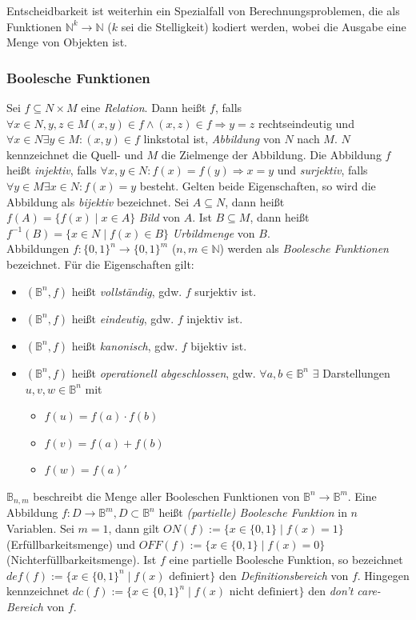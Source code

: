 Entscheidbarkeit ist weiterhin ein Spezialfall von Berechnungsproblemen, die als Funktionen $\mathbb{N}^k \rightarrow \mathbb{N}$ ($k$ sei die Stelligkeit) kodiert werden, wobei die Ausgabe eine Menge von Objekten ist.

\subsubsection{Boolesche Funktionen}
\label{sec:bFunktionen}
Sei $f \subseteq N \times M$ eine \emph{Relation}. Dann heißt $f$, falls $\forall x \in N, y,z \in M (x,y) \in f \wedge (x,z) \in f \Rightarrow y = z$ rechtseindeutig und $\forall x \in N \exists y \in M : (x,y) \in f$ linkstotal ist, \emph{Abbildung} von $N$ nach $M$. $N$ kennzeichnet die Quell- und $M$ die Zielmenge der Abbildung. Die Abbildung $f$ heißt \emph{injektiv}, falls $\forall x,y \in N : f(x) = f(y) \Rightarrow x = y$ und \emph{surjektiv}, falls $\forall y \in M \exists x \in N : f(x) = y$ besteht. Gelten beide Eigenschaften, so wird die Abbildung als \emph{bijektiv} bezeichnet. Sei $A \subseteq N$, dann heißt $f(A) = \{ f(x) \mid x \in A \}$ \emph{Bild} von $A$. Ist $B \subseteq M$, dann heißt $f^{-1}(B) = \{ x \in N \mid f(x) \in B \}$ \emph{Urbildmenge} von $B$.\\
Abbildungen $f: \{0, 1\}^n \rightarrow \{0, 1\}^m$ ($n,m \in \mathbb{N}$) werden als \emph{Boolesche Funktionen} bezeichnet. Für die Eigenschaften gilt:
\begin{itemize}
	\item $(\mathbb{B}^n, f)$ heißt \emph{vollständig}, gdw. $f$ surjektiv ist.
	\item $(\mathbb{B}^n, f)$ heißt \emph{eindeutig}, gdw. $f$ injektiv ist.
	\item $(\mathbb{B}^n, f)$ heißt \emph{kanonisch}, gdw. $f$ bijektiv ist.
	\item $(\mathbb{B}^n, f)$ heißt \emph{operationell abgeschlossen}, gdw. $\forall a,b \in \mathbb{B}^n$ $\exists$ Darstellungen $u,v,w \in \mathbb{B}^n$ mit
	\begin{itemize}
		\item $f(u) = f(a) \cdot f(b)$
		\item $f(v) = f(a) + f(b)$
		\item $f(w) = f(a)'$
	\end{itemize}
\end{itemize}
$\mathbb{B}_{n,m}$ beschreibt die Menge aller Booleschen Funktionen von $\mathbb{B}^n \rightarrow \mathbb{B}^m$. Eine Abbildung $f : D \rightarrow \mathbb{B}^m, D \subset \mathbb{B}^n$ heißt \emph{(partielle) Boolesche Funktion} in $n$ Variablen. Sei $m=1$, dann gilt $ON(f) := \{ x \in \{0,1 \} \mid f(x) = 1 \}$ (Erfüllbarkeitsmenge) und $OFF(f) := \{ x \in \{0,1 \} \mid f(x) = 0 \}$ (Nichterfüllbarkeitsmenge). Ist $f$ eine partielle Boolesche Funktion, so bezeichnet $def(f) := \{ x \in \{ 0, 1 \}^n \mid f(x) \text{ definiert}\}$ den \emph{Definitionsbereich} von $f$. Hingegen kennzeichnet $dc(f) := \{ x \in \{ 0, 1 \}^n \mid f(x) \text{ nicht definiert}\}$ den \emph{don't care-Bereich} von $f$.\\
